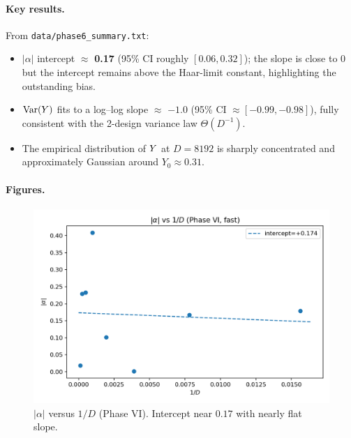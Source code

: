 \paragraph{Key results.}
From \texttt{data/phase6\_summary.txt}:
\begin{itemize}
  \item $|\alpha|$ intercept $\approx$ \textbf{0.17} (95\% CI roughly $[0.06, 0.32]$); the slope is close to $0$ but the intercept remains above the Haar-limit constant, highlighting the outstanding bias.
  \item $\mathrm{Var}(Y)$ fits to a log--log slope $\approx$ \textbf{$-1.0$} (95\% CI $\approx[-0.99,-0.98]$), fully consistent with the 2-design variance law $\Theta(D^{-1})$.
  \item The empirical distribution of $Y$ at $D=8192$ is sharply concentrated and approximately Gaussian around $Y_0\approx 0.31$.
\end{itemize}

\paragraph{Figures.}
\begin{figure}[h]
\centering
\includegraphics[width=0.72\linewidth]{../figures/phase6_alpha_vs_invD.png}
\caption{$|\alpha|$ versus $1/D$ (Phase VI). Intercept near $0.17$ with nearly flat slope.}
\end{figure}

